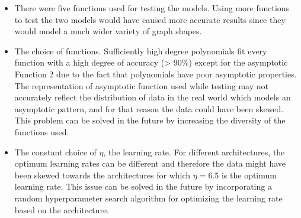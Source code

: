 \documentclass{article}
\begin{document}
    \begin{itemize}
        \item There were five functions used for testing the models. Using more functions to test the two models would have caused more accurate results since they would model a much wider variety of graph shapes.
        \item The choice of functions. Sufficiently high degree polynomials fit every function with a high degree of accuracy (> 90\%) except for the asymptotic Function 2 due to the fact that polynomials have poor asymptotic properties. The representation of asymptotic function used while testing may not accurately reflect the distribution of data in the real world which models an asymptotic pattern, and for that reason the data could have been skewed. This problem can be solved in the future by increasing the diversity of the functions used.
        \item The constant choice of $\eta$, the learning rate. For different architectures, the optimum learning rates can be different and therefore the data might have been skewed towards the architectures for which $\eta=6.5$ is the optimum learning rate. This issue can be solved in the future by incorporating a random hyperparameter search algorithm for optimizing the learning rate based on the architecture.
    \end{itemize}
\end{document}

